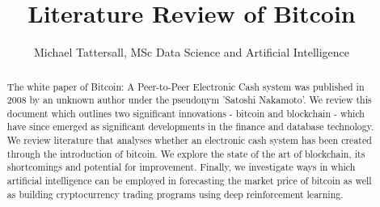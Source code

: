 \documentclass[report]{IEEEtran}
\begin{document}
\title{Literature Review of Bitcoin}
\author{Michael Tattersall, MSc Data Science and Artificial Intelligence %
}

\maketitle

\begin{abstract}
The white paper of Bitcoin: A Peer-to-Peer Electronic Cash system was published in 2008 by an unknown author under the pseudonym 'Satoshi Nakamoto'.  We review this document which outlines two significant innovations - bitcoin and blockchain - which have since emerged as significant developments in the finance and database technology.  We review literature that analyses whether an electronic cash system has been created through the introduction of  bitcoin.  We explore the state of the art of blockchain, its shortcomings and potential for improvement. Finally, we investigate ways in which artificial intelligence can be employed in forecasting the market price of bitcoin as well as building cryptocurrency trading programs using deep reinforcement learning. 
\end{abstract}
\end{document}
